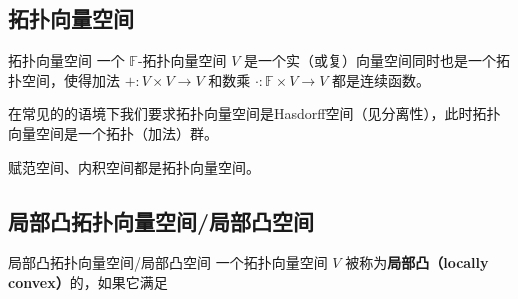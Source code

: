 

\subsection{拓扑向量空间}

\begin{definition}{拓扑向量空间}
一个 $\mathbb{F}$-拓扑向量空间 $V$ 是一个实（或复）向量空间同时也是一个拓扑空间，使得加法 $+: V \times V \to V$ 和数乘 $\cdot: \mathbb{F} \times V \to V$ 都是连续函数。

在常见的的语境下我们要求拓扑向量空间是Hasdorff空间（见分离性），此时拓扑向量空间是一个拓扑（加法）群。
\end{definition}

\begin{example}{}
赋范空间、内积空间都是拓扑向量空间。
\end{example}


\subsection{局部凸拓扑向量空间/局部凸空间}

\begin{definition}{局部凸拓扑向量空间/局部凸空间}
一个拓扑向量空间 $V$ 被称为\textbf{局部凸（locally convex）}的，如果它满足

\end{definition}


